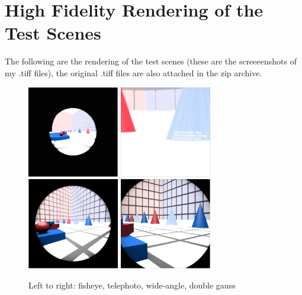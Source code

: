 \documentclass[10pt,letter]{scrartcl}
\theoremstyle{definition} %
\begin{document}
\section{High Fidelity Rendering of the Test Scenes}
The following are the rendering of the test scenes (these are the screeeenshots of my .tiff files), the original .tiff files are also attached in the zip archive.
\begin{figure}[H]
\centering
\includegraphics[width=40mm]{fisheye_screenshot.png}
\includegraphics[width=40mm]{telephoto_screenshot.png}
\includegraphics[width=40mm]{wide_screenshot.png}
\includegraphics[width=40mm]{dgauss_screenshot.png}
\caption{Left to right: fisheye, telephoto, wide-angle, double gauss}
\end{figure}
\end{document}
